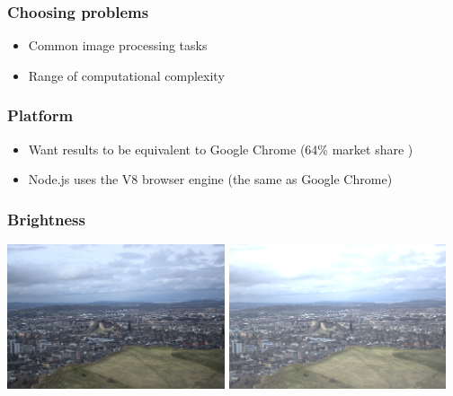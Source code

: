 \documentclass{beamer}
\begin{document}
\begin{frame}
    \frametitle{Choosing problems}
    \begin{itemize}
        \item Common image processing tasks
        \item Range of computational complexity
    \end{itemize}
\end{frame}

\begin{frame}
    \frametitle{Platform}
    \begin{itemize}
        \item Want results to be equivalent to Google Chrome (64\% market share \cite{webmarketshare})
        \item Node.js uses the V8 browser engine (the same as Google Chrome)
    \end{itemize}
\end{frame}

\begin{frame}
    \frametitle{Brightness}
    \begin{center}
        \includegraphics[width=0.48\textwidth]{default.png}
        \includegraphics[width=0.48\textwidth]{bright.png}
    \end{center}

\end{frame}
\end{document}
